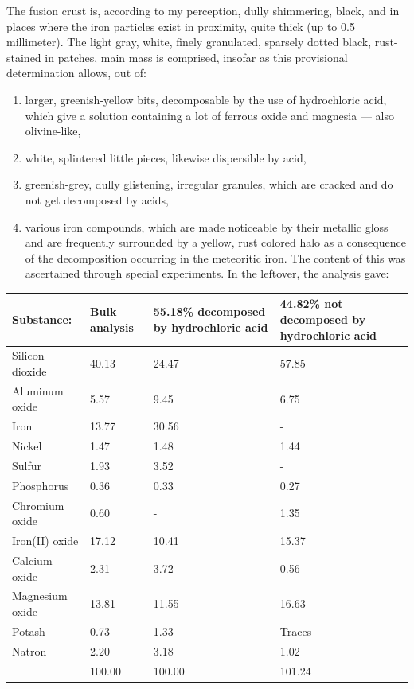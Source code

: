 \documentclass[a4paper, 12pt, oneside]{article}
\begin{document}
The fusion crust is, according to my perception, dully shimmering, black, and in places where the iron particles exist in proximity, quite thick (up to 0.5 millimeter). The light gray, white, finely granulated, sparsely dotted black, rust-stained in patches, main mass is comprised, insofar as this provisional determination allows, out of:
\begin{enumerate}
    \item larger, greenish-yellow bits, decomposable by the use of hydrochloric acid, which give a solution containing a lot of ferrous oxide and magnesia --- also olivine-like,
    \item white, splintered little pieces, likewise dispersible by acid,
    \item greenish-grey, dully glistening, irregular granules, which are cracked and do not get decomposed by acids,
    \item various iron compounds, which are made noticeable by their metallic gloss and are frequently surrounded by a yellow, rust colored halo as a consequence of the decomposition occurring in the meteoritic iron. The content of this was ascertained through special experiments. In the leftover, the analysis gave:
\end{enumerate}
\begin{center}
    \begin{tabular}{ |l|p{1.5cm}|p{3.2cm}|p{2.9cm}| }
        \hline
        Substance: & Bulk analysis & 55.18\% decomposed by hydrochloric acid & 44.82\% not decomposed by hydrochloric acid\\\hline
        Silicon dioxide & 40.13 & 24.47 & 57.85\\\hline
        Aluminum oxide & 5.57 & 9.45 & 6.75\\\hline
        Iron & 13.77 & 30.56 & -\\\hline
        Nickel & 1.47 & 1.48 & 1.44\\\hline
        Sulfur & 1.93 & 3.52 & -\\\hline
        Phosphorus & 0.36 & 0.33 & 0.27\\\hline
        Chromium oxide & 0.60 & - & 1.35\\\hline
        Iron(II) oxide & 17.12 & 10.41 & 15.37\\\hline
        Calcium oxide & 2.31 & 3.72 & 0.56\\\hline
        Magnesium oxide & 13.81 & 11.55 & 16.63\\\hline
        Potash & 0.73 & 1.33 & Traces\\\hline
        Natron & 2.20 & 3.18 & 1.02\\\hline
        & 100.00 & 100.00 & 101.24\\
        \hline
    \end{tabular}
\end{center}
\end{document}
